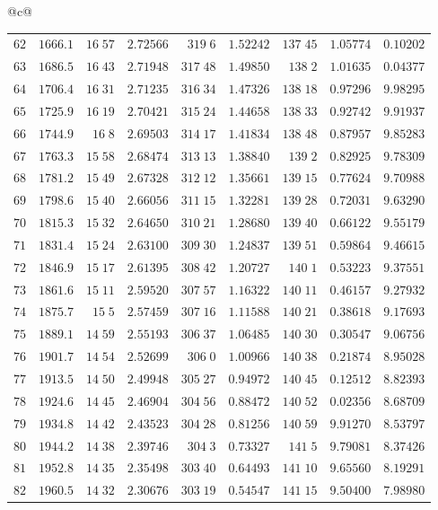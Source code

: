 \begin{center}
{\begin{tabular}{@{}c@{}}
\begin{tabular}{r|r|r|r|r|r|r|r|r}
$62$&$1666.1$&$16\;57$&$2.72566$&$319\;6$&$1.52242$&$137\;45$&$1.05774$&$0.10202$\\
$63$&$1686.5$&$16\;43$&$2.71948$&$317\;48$&$1.49850$&$138\;2$&$1.01635$&$0.04377$\\
$64$&$1706.4$&$16\;31$&$2.71235$&$316\;34$&$1.47326$&$138\;18$&$0.97296$&$9.98295$\\[2pt]
$65$&$1725.9$&$16\;19$&$2.70421$&$315\;24$&$1.44658$&$138\;33$&$0.92742$&$9.91937$\\
$66$&$1744.9$&$16\;8$&$2.69503$&$314\;17$&$1.41834$&$138\;48$&$0.87957$&$9.85283$\\
$67$&$1763.3$&$15\;58$&$2.68474$&$313\;13$&$1.38840$&$139\;2$&$0.82925$&$9.78309$\\
$68$&$1781.2$&$15\;49$&$2.67328$&$312\;12$&$1.35661$&$139\;15$&$0.77624$&$9.70988$\\
$69$&$1798.6$&$15\;40$&$2.66056$&$311\;15$&$1.32281$&$139\;28$&$0.72031$&$9.63290$\\[2pt]
$70$&$1815.3$&$15\;32$&$2.64650$&$310\;21$&$1.28680$&$139\;40$&$0.66122$&$9.55179$\\
$71$&$1831.4$&$15\;24$&$2.63100$&$309\;30$&$1.24837$&$139\;51$&$0.59864$&$9.46615$\\
$72$&$1846.9$&$15\;17$&$2.61395$&$308\;42$&$1.20727$&$140\;1$&$0.53223$&$9.37551$\\
$73$&$1861.6$&$15\;11$&$2.59520$&$307\;57$&$1.16322$&$140\;11$&$0.46157$&$9.27932$\\
$74$&$1875.7$&$15\;5$&$2.57459$&$307\;16$&$1.11588$&$140\;21$&$0.38618$&$9.17693$\\[2pt]
$75$&$1889.1$&$14\;59$&$2.55193$&$306\;37$&$1.06485$&$140\;30$&$0.30547$&$9.06756$\\
$76$&$1901.7$&$14\;54$&$2.52699$&$306\;0$&$1.00966$&$140\;38$&$0.21874$&$8.95028$\\
$77$&$1913.5$&$14\;50$&$2.49948$&$305\;27$&$0.94972$&$140\;45$&$0.12512$&$8.82393$\\
$78$&$1924.6$&$14\;45$&$2.46904$&$304\;56$&$0.88472$&$140\;52$&$0.02356$&$8.68709$\\
$79$&$1934.8$&$14\;42$&$2.43523$&$304\;28$&$0.81256$&$140\;59$&$9.91270$&$8.53797$\\[2pt]
$80$&$1944.2$&$14\;38$&$2.39746$&$304\;3$&$0.73327$&$141\;5$&$9.79081$&$8.37426$\\
$81$&$1952.8$&$14\;35$&$2.35498$&$303\;40$&$0.64493$&$141\;10$&$9.65560$&$8.19291$\\
$82$&$1960.5$&$14\;32$&$2.30676$&$303\;19$&$0.54547$&$141\;15$&$9.50400$&$7.98980$\\

\end{tabular}
\end{tabular}}
\end{center}
